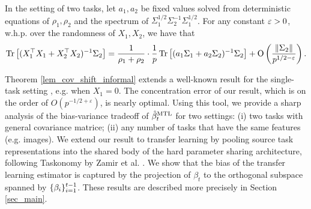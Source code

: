 \begin{theorem}[Informal]\label{lem_cov_shift_informal}
	In the setting of two tasks, let $a_1, a_2$ be fixed values solved from deterministic equations of $\rho_1, \rho_2$ and the spectrum of $\Sigma_1^{1/2}\Sigma_2^{-1}\Sigma_1^{1/2}$.
	For any constant ${\varepsilon}>0$, w.h.p. over the randomness of $X_1, X_2$, we have that
	\begin{align*}
		\operatorname{Tr}\left[(X_1^{\top}X_1 + X_2^{\top}X_2)^{-1}\Sigma_2\right] = \frac{1}{\rho_1+\rho_2}\cdot \frac1p\operatorname{Tr}\left[ (a_1 \Sigma_1 + a_2\Sigma_2)^{-1} \Sigma_2\right] +\operatorname{O}\left(\frac{\|\Sigma_2\|}{p^{1/2-\varepsilon}}\right).
	\end{align*}
\end{theorem}

Theorem \ref{lem_cov_shift_informal} extends a well-known result for the single-task setting \cite{S07}, e.g. when $X_1 = 0$.
The concentration error of our result, which is on the order of $O(p^{-1/2+\varepsilon})$, is nearly optimal.
Using this tool,
we provide a sharp analysis of the bias-variance tradeoff of $\hat{\beta}_t^{\text{MTL}}$ for two settings:
(i) two tasks with general covariance matrice; (ii) any number of tasks that have the same features (e.g. images).
We extend our result to transfer learning
by pooling source task representations into the shared body of the hard parameter sharing architecture, following Taskonomy by Zamir et al. \cite{ZSSGM18}.
We show that the bias of the transfer learning estimator is captured by the projection of $\beta_t$ to the orthogonal subspace spanned by $\{\beta_i\}_{i=1}^{t-1}$.
These results are described more precisely in Section \ref{sec_main}.

